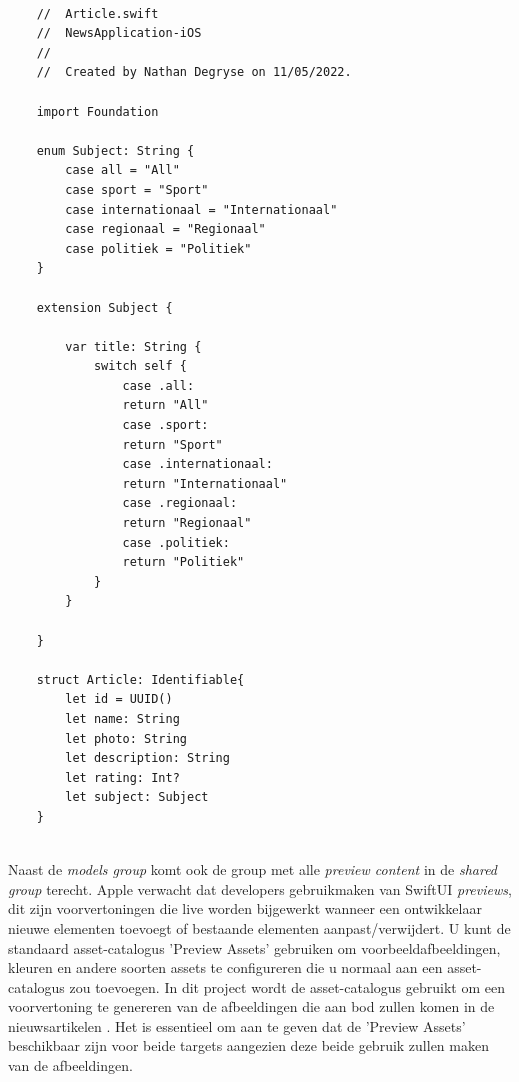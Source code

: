 \newpage
\begin{lstlisting}
    
    //  Article.swift
    //  NewsApplication-iOS
    //
    //  Created by Nathan Degryse on 11/05/2022.
    
    import Foundation
    
    enum Subject: String {
        case all = "All"
        case sport = "Sport"
        case internationaal = "Internationaal"
        case regionaal = "Regionaal"
        case politiek = "Politiek"
    }
    
    extension Subject {
        
        var title: String {
            switch self {
                case .all:
                return "All"
                case .sport:
                return "Sport"
                case .internationaal:
                return "Internationaal"
                case .regionaal:
                return "Regionaal"
                case .politiek:
                return "Politiek"
            }
        }
        
    }
    
    struct Article: Identifiable{
        let id = UUID()
        let name: String
        let photo: String
        let description: String
        let rating: Int?
        let subject: Subject
    }
    
\end{lstlisting}
\newpage

Naast de \textit{models group} komt ook de group met alle \textit{preview content} in de \textit{shared group} terecht. Apple verwacht dat developers gebruikmaken van SwiftUI \textit{previews}, dit zijn voorvertoningen die live worden bijgewerkt wanneer een ontwikkelaar nieuwe elementen toevoegt of bestaande elementen aanpast/verwijdert. U kunt de standaard asset-catalogus 'Preview Assets' gebruiken om voorbeeldafbeeldingen, kleuren en andere soorten assets te configureren die u normaal aan een asset-catalogus zou toevoegen. In dit project wordt de asset-catalogus gebruikt om een voorvertoning te genereren van de afbeeldingen die aan bod zullen komen in de nieuwsartikelen \autocite{VanDerLee2021}. Het is essentieel om aan te geven dat de 'Preview Assets' beschikbaar zijn voor beide targets aangezien deze beide gebruik zullen maken van de afbeeldingen.

